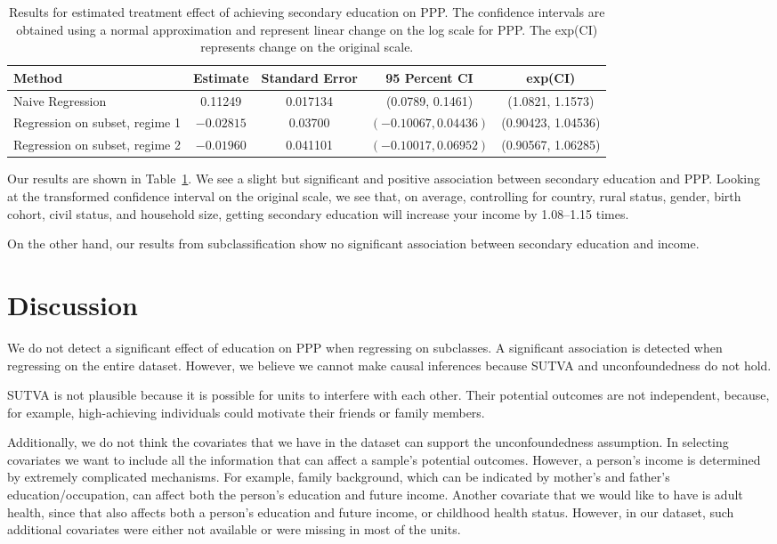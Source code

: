 \documentclass[letterpaper,11pt]{article}
\begin{document}
\begin{table}[htb]
\begin{tabular}{p{4cm}|cccc}
Method  & Estimate  & Standard Error  & 95 Percent CI  & exp(CI)\tabularnewline
\hline 
Naive Regression  & 0.11249  & 0.017134  & (0.0789, 0.1461)  & (1.0821, 1.1573)\tabularnewline
Regression on subset, regime 1  & $-0.02815$  & 0.03700  & $(-0.10067,0.04436)$  & (0.90423, 1.04536) \tabularnewline
Regression on subset, regime 2  & $-0.01960$  & 0.041101  & $(-0.10017,0.06952)$  & (0.90567, 1.06285) \tabularnewline
\end{tabular}\protect\caption{Results for estimated treatment effect of
achieving secondary education on PPP. The confidence intervals are obtained
using a normal approximation and represent linear change on the log scale for
PPP. The exp(CI) represents change on the original scale.}
\label{tab:results} 
\end{table}


Our results are shown in Table~\ref{tab:results}. We see a slight but
significant and positive association between secondary education and PPP.
Looking at the transformed confidence interval on the original scale, we see
that, on average, controlling for country, rural status, gender, birth cohort,
civil status, and household size, getting secondary education will increase your
income by 1.08--1.15 times.

On the other hand, our results from subclassification show no significant
association between secondary education and income.


\section{Discussion}

We do not detect a significant effect of education on PPP when regressing on
subclasses.  A significant association is detected when regressing on the entire
dataset. However, we believe we cannot make causal inferences because SUTVA and
unconfoundedness do not hold.

SUTVA is not plausible because it is possible for units to interfere with each
other.  Their potential outcomes are not independent, because, for example,
high-achieving individuals could motivate their friends or family members.

Additionally, we do not think the covariates that we have in the dataset can
support the unconfoundedness assumption. In selecting covariates we want to
include all the information that can affect a sample's potential outcomes.
However, a person's income is determined by extremely complicated mechanisms.
For example, family background, which can be indicated by mother's and father's
education/occupation, can affect both the person's education and future income.
Another covariate that we would like to have is adult health, since that also
affects both a person's education and future income, or childhood health status.
However, in our dataset, such additional covariates were either not available or
were missing in most of the units.
\end{document}
